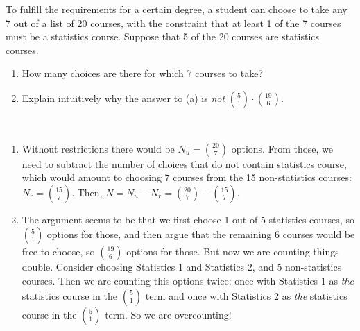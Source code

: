 
\setcounter{theorem}{7}

\begin{exercise}[BH.10]
	To fulfill the requirements for a certain degree, a student can choose to take any 7 out of a list of 20 courses, with the constraint that at least 1 of the 7 courses must be a statistics course. Suppose that 5 of the 20 courses are statistics courses.
	\begin{enumerate}
		\item How many choices are there for which 7 courses to take?
		\item Explain intuitively why the answer to (a) is \emph{not} $\binom{5}{1} \cdot \binom{19}{6}$.
	\end{enumerate}
\begin{solution}~
	 \begin{enumerate}
	 	\item Without restrictions there would be $N_{u}={20\choose 7}$ options. From those, we need to subtract the number of choices that do not contain statistics course, which would amount to choosing 7 courses from the 15 non-statistics courses: $N_{r} = {15\choose 7}$. Then, $N=N_{u}-N_{r}={20\choose 7}-{15 \choose 7}$.
		\item The argument seems to be that we first choose 1 out of 5 statistics courses, so ${5 \choose 1}$ options for those, and then argue that the remaining 6 courses would be free to choose, so ${19 \choose 6}$ options for those. But now we are counting things double. Consider choosing Statistics 1 and Statistics 2, and 5 non-statistics courses. Then we are counting this options twice: once with Statistics 1 as \textit{the} statistics course in the ${5 \choose 1}$ term and once with Statistics 2 as \textit{the} statistics course in the ${5 \choose 1}$ term. So we are overcounting!
	 \end{enumerate}
\end{solution}
\end{exercise}

